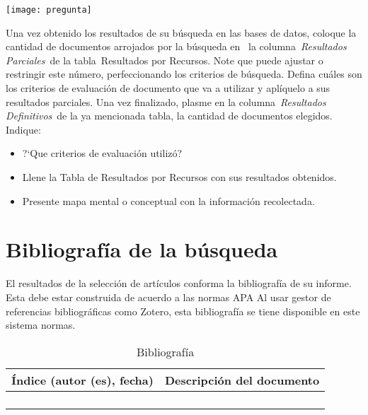 \begin{marginfigure}[-1.2cm]%
	\texttt{[image: pregunta]}
\end{marginfigure}

\begin{kaobox}[frametitle=Ejercicio]

	 Una vez obtenido los resultados de su búsqueda en las bases de datos, coloque la cantidad de documentos arrojados por la búsqueda en  la columna\textit{ Resultados Parciales} de la tabla Resultados por Recursos.
	Note que puede ajustar o restringir este número, perfeccionando los criterios de búsqueda.
	Defina cu\'ales son los criterios de evaluación de documento que va a utilizar y aplíquelo a sus resultados parciales. Una vez finalizado, plasme en la columna \textit{Resultados Definitivos} de la ya mencionada tabla, la cantidad de documentos elegidos.
	Indique:
		\begin{itemize}
			\item ?`Que criterios de evaluación utilizó?
			\item  Llene la Tabla de Resultados por Recursos con sus resultados obtenidos.
			\item Presente mapa mental o conceptual con la  informaci\'on recolectada.
		\end{itemize}
	\end{kaobox}


\section{Bibliograf\'ia de la b\'usqueda}


El resultados de la selección de artículos conforma la bibliografía de su informe. Esta debe estar construida de acuerdo a las normas APA   Al usar gestor de referencias bibliográficas  como Zotero, esta bibliografía se tiene disponible en este sistema normas. 



\begin{table}[h] 
	\footnotesize%
	\begin{center}
		\footnotesize
		\begin{tabular}{|c|c|}
			\hline
			\'Indice (autor (es), fecha) & Descripci\'on del documento     \\
			\hline  			
			  &    \\
			  \hline
			    &  \\
			    \hline
			   &  \\
			   \hline
		  &  \\
		 
			\hline  			
			
		\end{tabular}
	\end{center}
	\caption{Bibliograf\'ia }
	\label{tab:biblio}
\end{table} 


